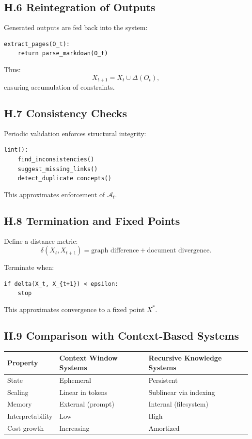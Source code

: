 \documentclass[12pt, oneside]{article}
\theoremstyle{plain}
\theoremstyle{definition}
\theoremstyle{remark}
\begin{document}
\subsection{H.6 Reintegration of Outputs}

Generated outputs are fed back into the system:

\begin{verbatim}
extract_pages(O_t):
    return parse_markdown(O_t)
\end{verbatim}

Thus:
\[
X_{t+1} = X_t \cup \Delta(O_t),
\]
ensuring accumulation of constraints.

\subsection{H.7 Consistency Checks}

Periodic validation enforces structural integrity:

\begin{verbatim}
lint():
    find_inconsistencies()
    suggest_missing_links()
    detect_duplicate concepts()
\end{verbatim}

This approximates enforcement of $\mathcal{A}_t$.

\subsection{H.8 Termination and Fixed Points}

Define a distance metric:
\[
\delta(X_t, X_{t+1}) = \text{graph difference} + \text{document divergence}.
\]

Terminate when:
\begin{verbatim}
if delta(X_t, X_{t+1}) < epsilon:
    stop
\end{verbatim}

This approximates convergence to a fixed point $X^*$.

\subsection{H.9 Comparison with Context-Based Systems}

\begin{center}
\begin{tabular}{lll}
\toprule
Property & Context Window Systems & Recursive Knowledge Systems \\
\midrule
State & Ephemeral & Persistent \\
Scaling & Linear in tokens & Sublinear via indexing \\
Memory & External (prompt) & Internal (filesystem) \\
Interpretability & Low & High \\
Cost growth & Increasing & Amortized \\
\bottomrule
\end{tabular}
\end{center}
\end{document}
